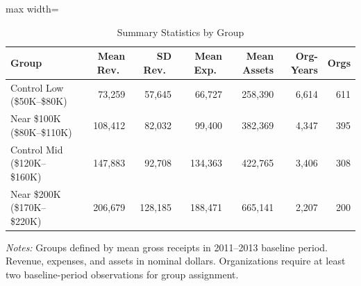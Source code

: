 \begin{table}[htbp]
\centering
\caption{Summary Statistics by Group}
\label{tab:summary}
\begin{adjustbox}{max width=\textwidth}
\begin{tabular}{lrrrrrr}
\hline\hline
Group & Mean Rev.\ & SD Rev.\ & Mean Exp.\ & Mean Assets & Org-Years & Orgs \\
\hline
Control Low (\$50K--\$80K) & 73,259 & 57,645 & 66,727 & 258,390 & 6,614 & 611 \\
Near \$100K (\$80K--\$110K) & 108,412 & 82,032 & 99,400 & 382,369 & 4,347 & 395 \\
Control Mid (\$120K--\$160K) & 147,883 & 92,708 & 134,363 & 422,765 & 3,406 & 308 \\
Near \$200K (\$170K--\$220K) & 206,679 & 128,185 & 188,471 & 665,141 & 2,207 & 200 \\
\hline\hline
\end{tabular}
\end{adjustbox}
\begin{tablenotes}
\item \textit{Notes:} Groups defined by mean gross receipts in 2011--2013 baseline period. 
Revenue, expenses, and assets in nominal dollars. Organizations require at least two 
baseline-period observations for group assignment.
\end{tablenotes}
\end{table}
